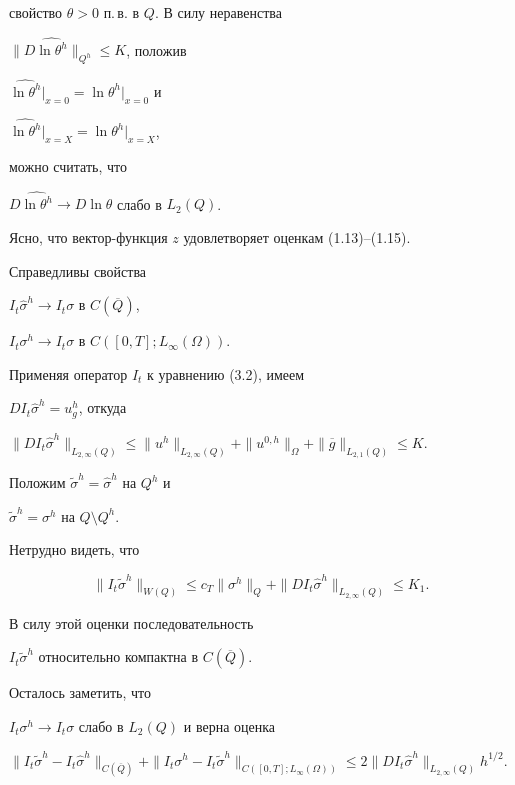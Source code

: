 \documentclass[12pt]{article}
\theoremstyle{plain} %
\newtheorem{lemm}{\hskip\parindent Лемма}[section]
\theoremstyle{definition}
\numberwithin{equation}{section}
\begin{document}
свойство $\theta>0$ п.\,в. в $Q$. В силу неравенства


$\|D\widehat{\ln\theta^h}\|_{Q^h}\le K$, положив


$\widehat{\ln\theta^h}\bigr|_{x=0}=\ln\theta^h\bigr|_{x=0}$ и


$\widehat{\ln\theta^h}\bigr|_{x=X}=\ln\theta^h\bigr|_{x=X}$,


можно считать, что


$D\widehat{\ln\theta^h}\to D\ln\theta$ слабо в $L_2(Q)$.





Ясно, что вектор-функция $z$ удовлетворяет оценкам (1.13)--(1.15).





\begin{lemm} Справедливы свойства


$I_t\widehat\sigma^h\to I_t\sigma$ в $C(\overline Q)$,


$I_t\sigma^h\to I_t\sigma$ в $C([0,T]; L_\infty(\Omega))$.


\end{lemm}





\begin{pf} Применяя оператор $I_t$ к уравнению (3.2), имеем


$DI_t\widehat\sigma^h=u^h_g$, откуда


$\|DI_t\widehat\sigma^h\|_{L_{2,\infty}(Q)}


\le \|u^h\|_{L_{2,\infty}(Q)}+\|u^{0,h}\|_\Omega+


\|\overline g\|_{L_{2,1}(Q)}\le K$.





Положим $\widetilde \sigma^h=\widehat \sigma^h$ на $Q^h$ и


$\widetilde \sigma^h= \sigma^h$ на $Q\setminus Q^h$.


Нетрудно видеть, что


$$


\|I_t\widetilde\sigma^h\|_{W(Q)} \le


c_T\|\sigma^h\|_Q+ \|DI_t\widehat\sigma^h\|_{L_{2,\infty}(Q)}\le K_1.


$$


В силу этой оценки последовательность


$I_t\widetilde\sigma^h$ относительно компактна в $C(\overline Q)$.


Осталось заметить, что


$I_t \sigma^h\to I_t\sigma$ слабо в $L_2(Q)$ и верна оценка


$\|I_t\widetilde\sigma^h-I_t\widehat\sigma^h\|_{C(\overline Q)}


+ \|I_t\sigma^h-I_t\widetilde\sigma^h\|_{C([0,T];L_\infty(\Omega))}


\le 2\|DI_t\widehat\sigma^h\|_{L_{2,\infty}(Q)}h^{1/2}$.


\end{pf}
\end{document}
